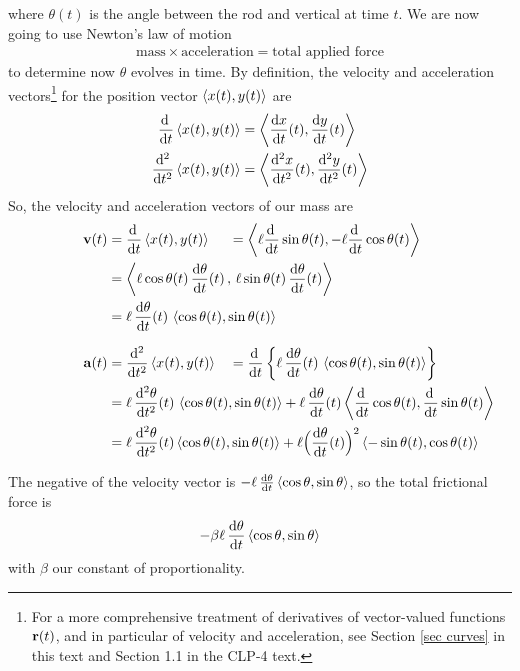 where $\theta(t)$ is the angle between the rod and vertical at time $t$.
We are now going to use Newton's law of motion
\begin{align*}
\text{mass}\times\text{acceleration}=\text{total applied force}
\end{align*}
to determine now $\theta$ evolves in time. By definition, the
velocity and acceleration vectors\footnote{For a more comprehensive treatment 
of derivatives of vector-valued functions $\mathbf{r}(t)$, and in particular of
velocity and acceleration, see Section \ref{sec curves} in this text and
Section 1.1 in the CLP-4 text.} for the position vector 
$\left< x(t),y(t)\right>$ are
\begin{align*}
\diff{}{t}\llt x(t),y(t)\rgt 
   &= \llt \diff{x}{t}(t),\diff{y}{t}(t)\rgt \\
\ddiff{2}{}{t}\llt x(t),y(t)\rgt 
   &=\llt \ddiff{2}{x}{t}(t),\ddiff{2}{y}{t}(t)\rgt 
\end{align*}
So, the velocity and acceleration vectors of our mass are
\begin{alignat*}{3}
\vv(t)&=\diff{}{t}\llt x(t),y(t)\rgt 
&&=\llt \ell\diff{}{t}\sin\theta(t),-\ell\diff{}{t}\cos\theta(t)\rgt \\
&=\llt \ell\cos\theta(t)\,\diff{\theta}{t}(t)\,,\,
             \ell\sin\theta(t)\,\diff{\theta}{t}(t)\rgt\hidewidth \\
&=\ell\,\diff{\theta}{t}(t)\,\llt \cos\theta(t),\sin\theta(t)\rgt \hidewidth
  \\[0.1in]
\va(t)&=\ddiff{2}{}{t}\llt x(t),y(t)\rgt 
&&=\diff{}{t}
  \left\{\ell\,\diff{\theta}{t}(t)\,
               \llt \cos\theta(t),\sin\theta(t)\rgt \right\} \\ 
&=\ell\,\ddiff{2}{\theta}{t}(t)\,\llt \cos\theta(t),\sin\theta(t)\rgt 
+\ell\,\diff{\theta}{t}(t)
       \llt \diff{}{t}\cos\theta(t),\diff{}{t}\sin\theta(t)\rgt \,\hidewidth\\
&= \ell\,\ddiff{2}{\theta}{t}(t)\llt \cos\theta(t),\sin\theta(t)\rgt 
+\ell \Big(\diff{\theta}{t}(t)\Big)^2
     \llt -\sin\theta(t),\cos\theta(t)\rgt\hidewidth
\end{alignat*}

The negative of the velocity vector is  
$- \ell\, \diff{\theta}{t}\llt \cos\theta,\sin\theta\rgt$, so the total frictional force is 
\begin{equation*}
-\beta\ell\, \diff{\theta}{t}\llt \cos\theta,\sin\theta\rgt 
\end{equation*} 
with $\beta$ our constant of proportionality. 

